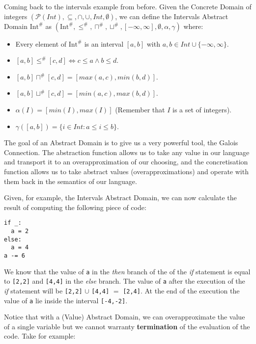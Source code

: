Coming back to the intervals example from before. Given the Concrete
Domain of integers
\((\mathcal{P}(Int), \subseteq, \cap, \cup, Int, \emptyset)\), we can
define the Intervals Abstract Domain \(\text{Int}^{\#}\) as
\((\text{Int}^{\#}, \le^{\#}, \sqcap^{\#}, \sqcup^{\#}, [-\infty,\infty], \emptyset, \alpha, \gamma)\)
where:

\begin{itemize}
\tightlist
\item
  Every element of \(\text{Int}^{\#}\) is an interval \([a, b]\) with
  \(a, b \in Int \cup \{-\infty,\infty\}\).
\item
  \([a, b] \le^{\#} [c, d] \iff c \le a \wedge b \le d\).
\item
  \([a, b] \sqcap^{\#} [c, d] = [max(a,c), min(b, d)]\).
\item
  \([a, b] \sqcup^{\#} [c, d] = [min(a,c), max(b, d)]\).
\item
  \(\alpha(I) = [min(I), max(I)]\) (Remember that \(I\) is a set of
  integers).
\item
  \(\gamma([a, b]) = \{i \in Int : a \le i \le b\}\).
\end{itemize}

The goal of an Abstract Domain is to give us a very powerful tool, the
Galois Connection. The abstraction function allows us to take any value
in our language and transport it to an overapproximation of our
choosing, and the concretisation function allows us to take abstract
values (overapproximations) and operate with them back in the semantics
of our language.

Given, for example, the Intervals Abstract Domain, we can now calculate
the result of computing the following piece of code:

\begin{verbatim}
if _:
  a = 2
else:
  a = 4
a -= 6
\end{verbatim}

We know that the value of \texttt{a} in the \emph{then} branch of the of
the \emph{if} statement is equal to \texttt{{[}2,2{]}} and
\texttt{{[}4,4{]}} in the \emph{else} branch. The value of \texttt{a}
after the execution of the \emph{if} statement will be
\texttt{{[}2,2{]}} \(\cup{}\) \texttt{{[}4,4{]}} \(=\)
\texttt{{[}2,4{]}}. At the end of the execution the value of \texttt{a}
lie inside the interval \texttt{{[}-4,-2{]}}.

Notice that with a (Value) Abstract Domain, we can overapproximate the
value of a single variable but we cannot warranty \textbf{termination}
of the evaluation of the code. Take for example:

